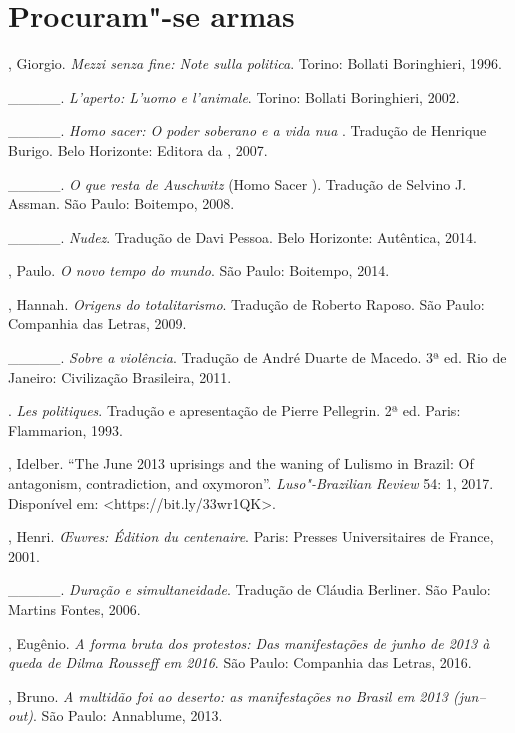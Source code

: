 \chapter{Procuram"-se armas}

\begin{Parskip}
, Giorgio. \emph{Mezzi senza fine: Note sulla politica}.
Torino: Bollati Boringhieri, 1996.

\_\_\_\_\_. \emph{L'aperto: L'uomo e l'animale}. Torino: Bollati
Boringhieri, 2002.

\_\_\_\_\_. \emph{Homo sacer: O poder soberano e a vida nua }.
Tradução de Henrique Burigo. Belo Horizonte: Editora da , 2007.

\_\_\_\_\_. \emph{O que resta de Auschwitz} (Homo Sacer ).
Tradução de Selvino J. Assman. São Paulo: Boitempo, 2008.

\_\_\_\_\_. \emph{Nudez}. Tradução de Davi Pessoa. Belo
Horizonte: Autêntica, 2014.

, Paulo. \emph{O novo tempo do mundo}. São Paulo: Boitempo, 2014.

, Hannah. \emph{Origens do totalitarismo}. Tradução de
Roberto Raposo. São Paulo: Companhia das Letras, 2009.

\_\_\_\_\_. \emph{Sobre a violência}. Tradução de André
Duarte de Macedo. 3ª ed. Rio de Janeiro: Civilização Brasileira, 2011.

. \emph{Les politiques}. Tradução e apresentação de Pierre Pellegrin. 2ª ed. Paris:  Flammarion, 1993.

, Idelber. ``The June 2013 uprisings and the waning of
Lulismo in Brazil: Of antagonism, contradiction, and oxymoron''.
\emph{Luso"-Brazilian Review} 54: 1, 2017. Disponível em:
\textless{}https://bit.ly/33wr1QK\textgreater{}.

, Henri. \emph{Œuvres: Édition du centenaire}. Paris:
Presses Universitaires de France, 2001.

\_\_\_\_\_. \emph{Duração e simultaneidade}. Tradução de Cláudia
Berliner. São Paulo: Martins Fontes, 2006.

, Eugênio. \emph{A forma bruta dos protestos: Das
manifestações de junho de 2013 à queda de Dilma Rousseff em 2016}. São
Paulo: Companhia das Letras, 2016.

, Bruno. \emph{A multidão foi ao deserto: as manifestações
no Brasil em 2013 (jun--out)}. São Paulo: Annablume, 2013.


\end{Parskip}
